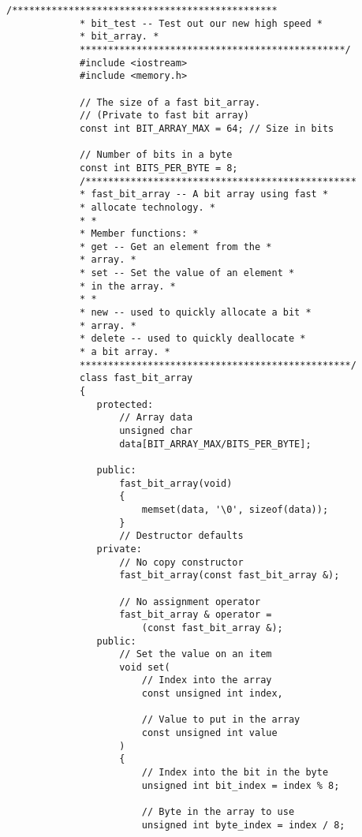 \begin{LTR}
        \begin{lstlisting}[style=C++Style]
             /***********************************************
             * bit_test -- Test out our new high speed *
             * bit_array. *
             ***********************************************/
             #include <iostream>
             #include <memory.h>

             // The size of a fast bit_array.
             // (Private to fast bit array)
             const int BIT_ARRAY_MAX = 64; // Size in bits

             // Number of bits in a byte
             const int BITS_PER_BYTE = 8;
             /************************************************
             * fast_bit_array -- A bit array using fast *
             * allocate technology. *
             * *
             * Member functions: *
             * get -- Get an element from the *
             * array. *
             * set -- Set the value of an element *
             * in the array. *
             * *
             * new -- used to quickly allocate a bit *
             * array. *
             * delete -- used to quickly deallocate *
             * a bit array. *
             ************************************************/
             class fast_bit_array
             {
             	protected:
             		// Array data
             		unsigned char
             		data[BIT_ARRAY_MAX/BITS_PER_BYTE];

             	public:
             		fast_bit_array(void)
             		{
             			memset(data, '\0', sizeof(data));
             		}
             		// Destructor defaults
             	private:
             		// No copy constructor
             		fast_bit_array(const fast_bit_array &);

             		// No assignment operator
             		fast_bit_array & operator =
             			(const fast_bit_array &);
             	public:
             		// Set the value on an item
             		void set(
             			// Index into the array
             			const unsigned int index,

             			// Value to put in the array
             			const unsigned int value
             		)
             		{
             			// Index into the bit in the byte
             			unsigned int bit_index = index % 8;

             			// Byte in the array to use
             			unsigned int byte_index = index / 8;


\end{lstlisting}
\end{LTR}
